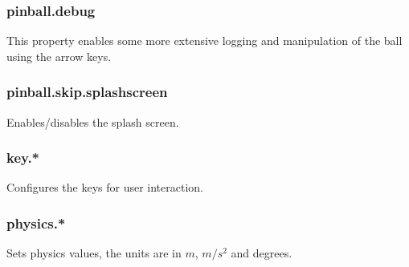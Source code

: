 \documentclass[fontsize=12pt,
               paper=a4,
               twoside=false,
               parskip=half,
               ]{scrartcl}
\begin{document}
\subsubsection{pinball.debug}

This property enables some more extensive logging and manipulation of the ball using the arrow keys.

\subsubsection{pinball.skip.splashscreen}

Enables/disables the splash screen.

\subsubsection{key.*}

Configures the keys for user interaction.

\subsubsection{physics.*}

Sets physics values, the units are in $m$, $m/s^{2}$ and degrees.
\end{document}

